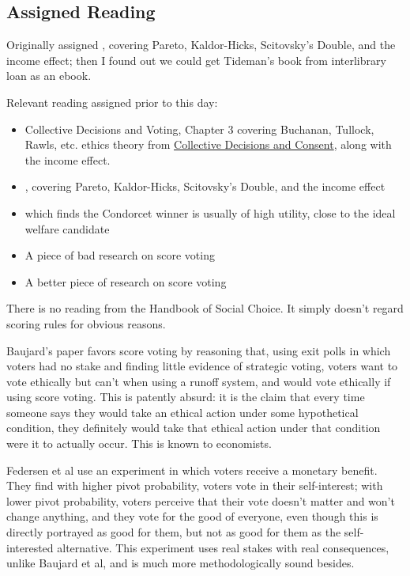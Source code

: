 \subsection{Assigned Reading}

\begin{boxcomment}
    Originally assigned , covering Pareto, Kaldor-Hicks, Scitovsky's Double, and the income effect; then I found out we could get Tideman's book from interlibrary loan as an ebook.
\end{boxcomment}

Relevant reading assigned prior to this day:

\begin{itemize}
    \item Collective Decisions and Voting, Chapter 3 \autocite[23-32]{Tideman2006} covering Buchanan, Tullock, Rawls, etc. ethics theory from \hyperref[cur:collective-decisions-consent]{Collective Decisions and Consent}, along with the income effect.

    \item {}, covering Pareto, Kaldor-Hicks, Scitovsky's Double, and the income effect

    \item \autocite{GreenArmytage2015} which finds the Condorcet winner is usually of high utility, close to the ideal welfare candidate

    \item A piece of bad research on score voting \autocite{Baujard2014}

    \item A better piece of research on score voting \autocite{Feddersen2009}
\end{itemize}

There is no reading from the Handbook of Social Choice.  It simply doesn't regard scoring rules for obvious reasons.

Baujard's paper favors score voting by reasoning that, using exit polls in which voters had no stake and finding little evidence of strategic voting, voters want to vote ethically but can't when using a runoff system, and would vote ethically if using score voting.  This is patently absurd:  it is the claim that every time someone says they would take an ethical action under some hypothetical condition, they definitely would take that ethical action under that condition were it to actually occur.  This is known to economists.

Federsen et al use an experiment in which voters receive a monetary benefit.  They find with higher pivot probability, voters vote in their self-interest; with lower pivot probability, voters perceive that their vote doesn't matter and won't change anything, and they vote for the good of everyone, even though this is directly portrayed as good for them, but not as good for them as the self-interested alternative.  This experiment uses real stakes with real consequences, unlike Baujard et al, and is much more methodologically sound besides.

